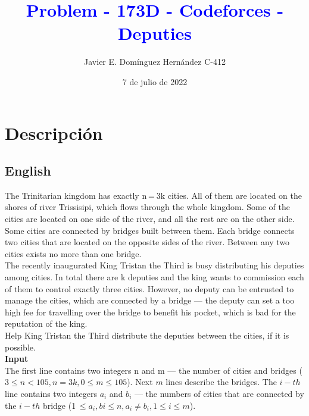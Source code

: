 \documentclass[12pt, a4paper]{article}
\begin{document}
    \title{\textcolor{blue}{\huge\textbf{Problem - 173D - Codeforces - Deputies}}\\}
	\author{\large{Javier E. Domínguez Hernández C-412}}  
    \date{7 de julio de 2022}
    \maketitle

	\section{Descripción}

	\subsection{English}
		The Trinitarian kingdom has exactly n = 3k cities. All of them are located on the shores of river Trissisipi, which flows through the whole kingdom. Some of the cities are located on one side of the river, and all the rest are on the other side.\\

		Some cities are connected by bridges built between them. Each bridge connects two cities that are located on the opposite sides of the river. Between any two cities exists no more than one bridge.\\

		The recently inaugurated King Tristan the Third is busy distributing his deputies among cities. In total there are k deputies and the king wants to commission each of them to control exactly three cities. However, no deputy can be entrusted to manage the cities, which are connected by a bridge — the deputy can set a too high fee for travelling over the bridge to benefit his pocket, which is bad for the reputation of the king.\\

		Help King Tristan the Third distribute the deputies between the cities, if it is possible.\\


		{\bf Input}\\

		The first line contains two integers n and m — the number of cities and bridges ($3 \le n < 105, n = 3k, 0 \le m \le 105$). Next $m$ lines describe the bridges. The $i-th$ line contains two integers $a_i$ and $b_i$ — the numbers of cities that are connected by the $i-th$ bridge (1 $ \le a_i , bi \le n, a_i \neq b_i, 1 \le  i \le m$).\\
\end{document}
